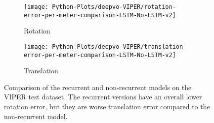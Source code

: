 		\begin{figure}
			\centering
			\begin{subfigure}[b]{0.5\linewidth}
				\centering
				\texttt{[image: Python-Plots/deepvo-VIPER/rotation-error-per-meter-comparison-LSTM-No-LSTM-v2]}
				\caption{
					Rotation
					\label{fig:avg-rotation-error-VIPER-LSTM-no-LSTM}
				}
			\end{subfigure}%
			\begin{subfigure}[b]{0.5\linewidth}
				\centering
				\texttt{[image: Python-Plots/deepvo-VIPER/translation-error-per-meter-comparison-LSTM-No-LSTM-v2]}
				\caption{
					Translation
					\label{fig:avg-translation-error-VIPER-LSTM-no-LSTM}
				}
			\end{subfigure}%
			\caption[Experiments on VIPER: The effect of replacing the LSTM]
					{Comparison of the recurrent and non-recurrent models on the VIPER test dataset.
					 The recurrent versions have an overall lower rotation error, but they are worse translation error compared to the non-recurrent model.
					 \label{fig:viper-effect-of-replacing-LSTM}}
		\end{figure}
		
